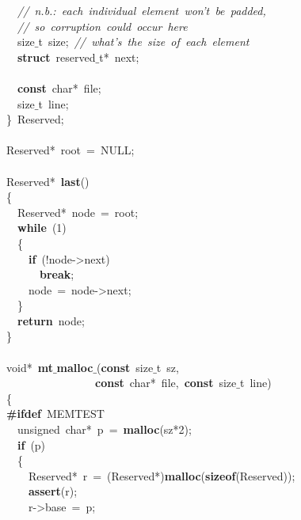 \documentclass{article}
\begin{document}
\mbox{}\ \ \textit{//\ n.b.:\ each\ individual\ element\ won't\ be\ padded,} \\
\mbox{}\ \ \textit{//\ so\ corruption\ could\ occur\ here} \\
\mbox{}\ \ size$\_$t\ size;\ \textit{//\ what's\ the\ size\ of\ each\ element} \\
\mbox{}\ \ \textbf{struct}\ reserved$\_$t*\ next; \\
\mbox{} \\
\mbox{}\ \ \textbf{const}\ char*\ file; \\
\mbox{}\ \ size$\_$t\ line; \\
\mbox{}\}\ Reserved; \\
\mbox{} \\
\mbox{}Reserved*\ root\ =\ NULL; \\
\mbox{} \\
\mbox{}Reserved*\ \textbf{last}() \\
\mbox{}\{ \\
\mbox{}\ \ Reserved*\ node\ =\ root; \\
\mbox{}\ \ \textbf{while}\ (1) \\
\mbox{}\ \ \{ \\
\mbox{}\ \ \ \ \textbf{if}\ (!node-\textgreater{}next) \\
\mbox{}\ \ \ \ \ \ \textbf{break}; \\
\mbox{}\ \ \ \ node\ =\ node-\textgreater{}next; \\
\mbox{}\ \ \} \\
\mbox{}\ \ \textbf{return}\ node; \\
\mbox{}\} \\
\mbox{} \\
\mbox{}void*\ \textbf{mt$\_$malloc$\_$}(\textbf{const}\ size$\_$t\ sz, \\
\mbox{}\ \ \ \ \ \ \ \ \ \ \ \ \ \ \ \ \textbf{const}\ char*\ file,\ \textbf{const}\ size$\_$t\ line) \\
\mbox{}\{ \\
\mbox{}\textbf{\#ifdef}\ MEMTEST \\
\mbox{}\ \ unsigned\ char*\ p\ =\ \textbf{malloc}(sz*2); \\
\mbox{}\ \ \textbf{if}\ (p) \\
\mbox{}\ \ \{ \\
\mbox{}\ \ \ \ Reserved*\ r\ =\ (Reserved*)\textbf{malloc}(\textbf{sizeof}(Reserved)); \\
\mbox{}\ \ \ \ \textbf{assert}(r); \\
\mbox{}\ \ \ \ r-\textgreater{}base\ =\ p; \\
\end{document}
